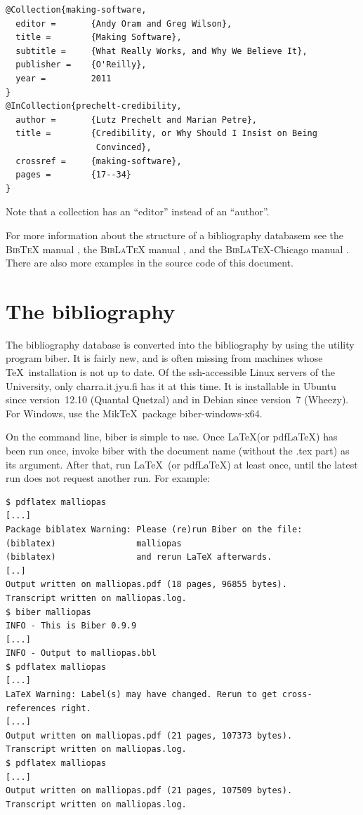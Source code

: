 \documentclass[utf8,english]{gradu3}
\begin{document}
\begingroup\footnotesize
\begin{verbatim}
@Collection{making-software,
  editor =       {Andy Oram and Greg Wilson},
  title =        {Making Software},
  subtitle =     {What Really Works, and Why We Believe It},
  publisher =    {O'Reilly},
  year =         2011
}
@InCollection{prechelt-credibility,
  author =       {Lutz Prechelt and Marian Petre},
  title =        {Credibility, or Why Should I Insist on Being
                  Convinced},
  crossref =     {making-software},
  pages =        {17--34}
}
\end{verbatim}
\endgroup

Note that a collection has an ``editor'' instead of an ``author''.

For more information about the structure of a bibliography databasem
see the \textsc{Bib\TeX} manual \parencite{bibtexing},
the \textsc{Bib\LaTeX} manual \parencite[Section~2]{biblatex-manual},
and the \textsc{Bib\LaTeX}-Chicago manual
\parencite[Sections 5.1--5.2]{biblatex-chicago-manual}.  There are
also more examples in the source code of this document.


\section{The bibliography}

The bibliography database is converted into the bibliography by using
the utility program {biber}.  It is fairly new, and is often missing
from machines whose \TeX\ installation is not up to date.  Of the
ssh-accessible Linux servers of the University, only charra.it.jyu.fi
has it at this time.  It is installable in Ubuntu since version~12.10
(Quantal Quetzal) and in Debian since version~7 (Wheezy).  For
Windows, use the Mik\TeX\ package biber-windows-x64.

On the command line, biber is simple to use.  Once \LaTeX (or
pdf\LaTeX) has been run once, invoke biber with the document name
(without the .tex part) as its argument.  After that, run \LaTeX\ (or
pdf\LaTeX) at least once, until the latest run does not request
another run.  For example:

\begingroup\footnotesize
\begin{verbatim}
$ pdflatex malliopas
[...]
Package biblatex Warning: Please (re)run Biber on the file:
(biblatex)                malliopas
(biblatex)                and rerun LaTeX afterwards.
[..]
Output written on malliopas.pdf (18 pages, 96855 bytes).
Transcript written on malliopas.log.
$ biber malliopas
INFO - This is Biber 0.9.9
[...]
INFO - Output to malliopas.bbl
$ pdflatex malliopas
[...]
LaTeX Warning: Label(s) may have changed. Rerun to get cross-references right.
[...]
Output written on malliopas.pdf (21 pages, 107373 bytes).
Transcript written on malliopas.log.
$ pdflatex malliopas
[...]
Output written on malliopas.pdf (21 pages, 107509 bytes).
Transcript written on malliopas.log.
\end{verbatim}
\endgroup
\end{document}
